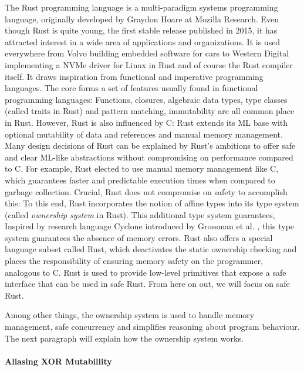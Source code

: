 \documentclass[twoside, english]{sdqthesis}
\theoremstyle{definition}
\begin{document}
The Rust programming language \cite{matsakis_rust_2014} is a multi-paradigm systems programming language, originally developed by Graydon Hoare at Mozilla Research.
Even though Rust is quite young, the first stable release published in 2015, it has attracted interest in a wide area of applications and organizations. It is used everywhere from Volvo building embedded software for cars \cite{foufas_why_2022} to Western Digital implementing a NVMe driver for Linux in Rust \cite{larabel_lpc_2022} and of course the Rust compiler itself.
It draws inspiration from functional and imperative programming languages. The core forms a set of features usually found in functional programming languages: Functions, closures, algebraic data types, type classes (called traits in Rust) and pattern matching, immutability are all common place in Rust.
However, Rust is also influenced by C: Rust extends its ML base with optional mutability of data and references and manual memory management. Many design decisions of Rust can be explained by Rust's ambitions to offer safe and clear ML-like abstractions without compromising on performance compared to C.
For example, Rust elected to use manual memory management like C, which guarantees faster and predictable execution times when compared to garbage collection. Crucial, Rust does not compromise on safety to accomplish this: To this end, Rust incorporates the notion of affine types into its type system (called \textit{ownership system} in Rust). This additional type system guarantees, 
Inspired by research language Cyclone introduced by Grossman et al. \cite{grossman_region-based_nodate}, this type system guarantees the absence of memory errors.
Rust also offers a special language subset called  Rust, which deactivates the static ownership checking and places the responsibility of ensuring memory safety on the programmer, analogous to C.  Rust is used to provide low-level primitives that expose a safe interface that can be used in safe Rust. From here on out, we will focus on safe Rust.

Among other things, the ownership system is used to handle memory management, safe concurrency and simplifies reasoning about program behaviour.
The next paragraph will explain how the ownership system works.

\paragraph{Aliasing XOR Mutabillity}
\end{document}
